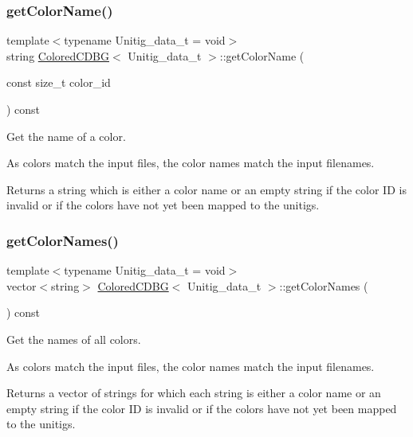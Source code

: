 \subsubsection{\texorpdfstring{get\+Color\+Name()}{getColorName()}}
{\footnotesize\ttfamily template$<$typename Unitig\+\_\+data\+\_\+t = void$>$ \\
string \hyperlink{classColoredCDBG}{Colored\+C\+D\+BG}$<$ Unitig\+\_\+data\+\_\+t $>$\+::get\+Color\+Name (\begin{DoxyParamCaption}\item[{const size\+\_\+t}]{color\+\_\+id }\end{DoxyParamCaption}) const}



Get the name of a color. 

As colors match the input files, the color names match the input filenames. \begin{DoxyReturn}{Returns}
a string which is either a color name or an empty string if the color ID is invalid or if the colors have not yet been mapped to the unitigs. 
\end{DoxyReturn}
\mbox{\label{classColoredCDBG_ae628f30cb64ba6047585c3df87ac344c}} 
\subsubsection{\texorpdfstring{get\+Color\+Names()}{getColorNames()}}
{\footnotesize\ttfamily template$<$typename Unitig\+\_\+data\+\_\+t = void$>$ \\
vector$<$string$>$ \hyperlink{classColoredCDBG}{Colored\+C\+D\+BG}$<$ Unitig\+\_\+data\+\_\+t $>$\+::get\+Color\+Names (\begin{DoxyParamCaption}{ }\end{DoxyParamCaption}) const}



Get the names of all colors. 

As colors match the input files, the color names match the input filenames. \begin{DoxyReturn}{Returns}
a vector of strings for which each string is either a color name or an empty string if the color ID is invalid or if the colors have not yet been mapped to the unitigs. 
\end{DoxyReturn}
\mbox{\label{classColoredCDBG_a53c723997265f89ab284433670ab54f9}} 
